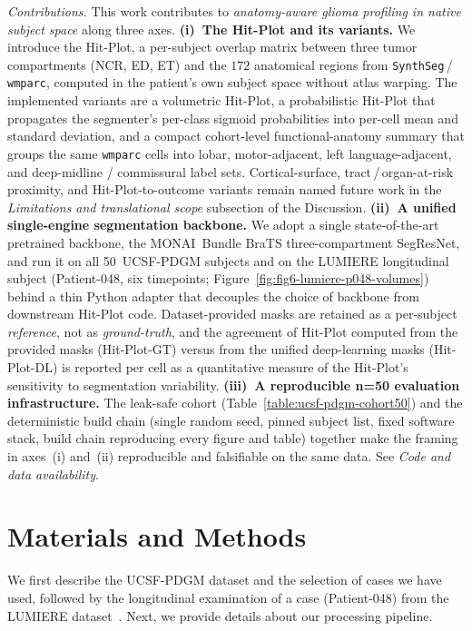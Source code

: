 \documentclass[a4paper,11pt,leqno]{article}
\begin{document}
\noindent\emph{Contributions.} This work contributes to
\emph{anatomy-aware glioma profiling in native subject space} along
three axes.
\textbf{(i)~The Hit-Plot and its variants.}
We introduce the Hit-Plot, a per-subject overlap matrix between three
tumor compartments (NCR, ED, ET) and the $172$ anatomical regions
from \texttt{SynthSeg}\,/\,\texttt{wmparc}, computed in the patient's
own subject space without atlas warping. The implemented variants are a volumetric Hit-Plot, a probabilistic Hit-Plot that
propagates the segmenter's per-class sigmoid probabilities into per-cell mean and
standard deviation, and a compact cohort-level functional-anatomy
summary that groups the same \texttt{wmparc} cells into lobar,
motor-adjacent, left language-adjacent, and deep-midline /
commissural label sets. Cortical-surface, tract\,/\,organ-at-risk
proximity, and Hit-Plot-to-outcome variants remain named
future work in the \emph{Limitations and translational scope}
subsection of the Discussion.
\textbf{(ii)~A unified single-engine segmentation backbone.}
We adopt a single state-of-the-art pretrained backbone, the
MONAI~Bundle BraTS three-compartment SegResNet, and run it on all
50~UCSF-PDGM subjects and on the LUMIERE longitudinal subject
(Patient-048, six timepoints;
Figure~\ref{fig:fig6-lumiere-p048-volumes}) behind a thin Python
adapter that decouples the choice of backbone from downstream
Hit-Plot code. Dataset-provided masks are retained as a per-subject
\emph{reference}, not as \emph{ground-truth}, and the agreement of
Hit-Plot computed from the provided masks (Hit-Plot-GT) versus from
the unified deep-learning masks (Hit-Plot-DL) is reported per cell
as a quantitative measure of the Hit-Plot's sensitivity to
segmentation variability.
\textbf{(iii)~A reproducible n=50 evaluation infrastructure.}
The leak-safe cohort (Table~\ref{table:ucsf-pdgm-cohort50}) and the
deterministic build chain (single random seed, pinned subject list,
fixed software stack, build chain reproducing every figure and
table) together make the framing in axes~(i) and~(ii) reproducible
and falsifiable on the same data. See \emph{Code and data availability}.


\section{Materials and Methods}


We first describe the UCSF-PDGM dataset and the selection of cases we
have used, followed by the longitudinal examination of a case (Patient-048) from the LUMIERE dataset~\cite{Suter2022}.
Next, we provide details about our processing pipeline.
\end{document}
